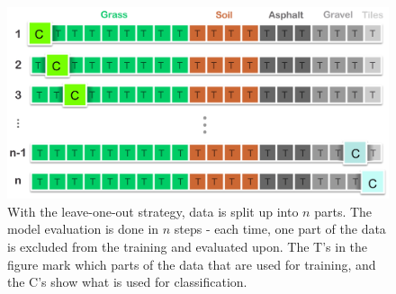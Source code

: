 \begin{figure}[h]
	\label{fig:loo}
	\centering
	\includegraphics[scale=0.3]{figs_temp/loo.jpg}
	\caption{With the leave-one-out strategy, data is split up into $n$ parts. The model evaluation is done in $n$ steps - each time, one part of the data is excluded from the training and evaluated upon. The T's in the figure mark which parts of the data that are used for training, and the C's show what is used for classification.}
\end{figure}

